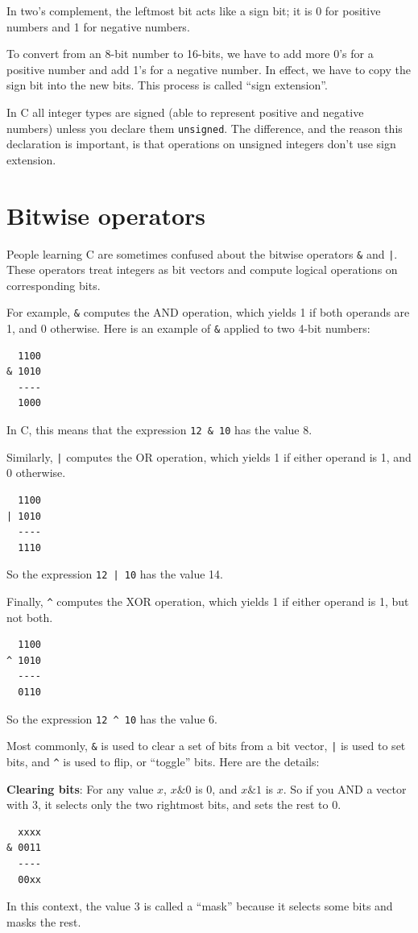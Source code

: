 \documentclass[12pt]{book}
\begin{document}
{In two's complement, the leftmost bit acts like a sign bit;
it is 0 for positive numbers and 1 for negative numbers.

To convert from an 8-bit number to 16-bits, we have to add
more 0's for a positive number and add 1's for a negative number.
In effect, we have to copy the sign bit into the new bits.
This process is called ``sign extension''.

In C all integer types are signed (able to represent positive and
negative numbers) unless you declare them {\tt unsigned}.  The
difference, and the reason this declaration is important, is that
operations on unsigned integers don't use sign extension.


\section{Bitwise operators}

People learning C are sometimes confused
about the bitwise operators \verb"&" and \verb"|".  These
operators treat integers as bit vectors and compute logical
operations on corresponding bits.

For example, \verb"&" computes the AND operation, which yields
1 if both operands are 1, and 0 otherwise.  Here is an example
of \verb"&" applied to two 4-bit numbers:
%
\begin{verbatim}
  1100
& 1010
  ----
  1000
\end{verbatim}
%
In C, this means that the expression \verb"12 & 10" has the
value 8.

Similarly, \verb"|" computes the OR operation, which yields
1 if either operand is 1, and 0 otherwise.
%
\begin{verbatim}
  1100
| 1010
  ----
  1110
\end{verbatim}
%
So the expression \verb"12 | 10" has the value 14.

Finally, \verb"^" computes the XOR operation, which yields
1 if either operand is 1, but not both.
%
\begin{verbatim}
  1100
^ 1010
  ----
  0110
\end{verbatim}
%
So the expression \verb"12 ^ 10" has the value 6.

Most commonly, \verb"&" is used to clear a set of bits from
a bit vector, \verb"|" is used to set bits, and \verb"^"
is used to flip, or ``toggle'' bits.  Here are the details:

{\bf Clearing bits}: For any value $x$, $x \& 0$ is 0, and $x \& 1$ is $x$.
So if you AND a vector with 3, it 
selects only the two rightmost bits, and sets the rest to 0.
%
\begin{verbatim}
  xxxx
& 0011
  ----
  00xx
\end{verbatim}
%
In this context, the value 3 is called a ``mask'' because it
selects some bits and masks the rest.

}
\end{document}
